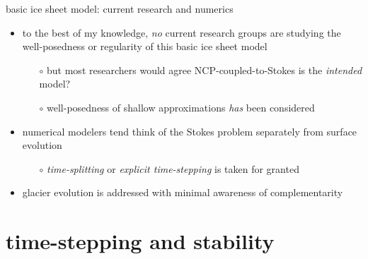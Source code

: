 \documentclass[svgnames,
               hyperref={colorlinks,citecolor=DeepPink4,linkcolor=FireBrick,urlcolor=Maroon},
               usepdftitle=false]  %
               {beamer}
\begin{document}
\begin{frame}{basic ice sheet model: current research and numerics}

\begin{itemize}
\item to the best of my knowledge, \emph{no} current research groups are studying the well-posedness or regularity of this basic ice sheet model
    \begin{itemize}
    \item[$\circ$] but most researchers would agree NCP-coupled-to-Stokes is the \emph{intended} model?
    \item[$\circ$] well-posedness of shallow approximations \emph{has} been considered
    \end{itemize}

\medskip
\item<2> numerical modelers tend think of the Stokes problem separately from surface evolution
    \begin{itemize}
    \item[$\circ$] \emph{time-splitting} or \emph{explicit time-stepping} is taken for granted
    \end{itemize}
\item<2> glacier evolution is addressed with minimal awareness of complementarity
\end{itemize}
\end{frame}



\section{time-stepping and stability}
\end{document}
